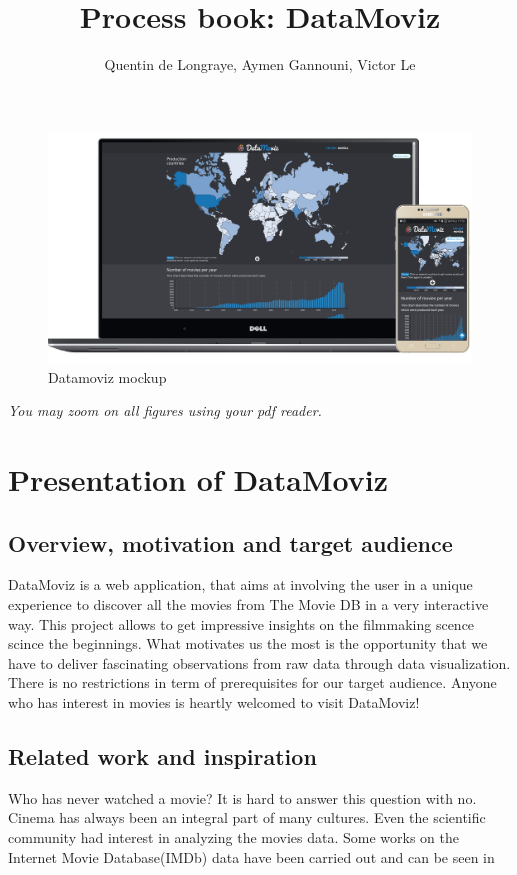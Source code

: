 \documentclass[a4paper,10pt]{article}
\begin{document}
\title{Process book: DataMoviz}
\author{Quentin de Longraye, Aymen Gannouni, Victor Le}

\maketitle

\begin{figure}[ht]
   \centering
   \includegraphics[width=0.8\linewidth]{../docs/mockup.png}
  \caption{Datamoviz mockup}
\end{figure}

\setlength{\parskip}{0.1\baselineskip}

\tableofcontents

\setlength{\parskip}{0.4\baselineskip}

\newpage

\textit{You may zoom on all figures using your pdf reader.}

\section{Presentation of DataMoviz}

\subsection{Overview, motivation and target audience}
DataMoviz is a web application, that aims at involving the user in a unique experience to discover all the movies from The Movie DB in a very interactive way. This project allows to get impressive insights on the filmmaking scence scince the beginnings.
What motivates us the most is the opportunity that we have to deliver fascinating observations from raw data through data visualization.
There is no restrictions in term of prerequisites for our target audience. Anyone who has interest in movies is heartly welcomed to visit DataMoviz!

\subsection{Related work and inspiration}
Who has never watched a movie? It is hard to answer this question with no. Cinema has always been an integral part of many cultures. Even the scientific community had interest in analyzing the movies data. Some works on the Internet Movie Database(IMDb) data have been carried out and can be seen in
\end{document}
